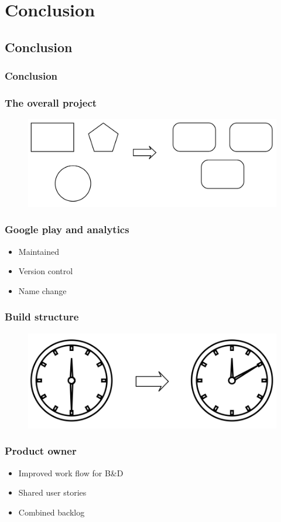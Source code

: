 \section{Conclusion}
\subsection{Conclusion}
\begin{frame}
	\frametitle{Conclusion}
\end{frame}

\begin{frame}
	\frametitle{The overall project}
	\begin{figure}[H]
		\centering
		\includegraphics[width= 0.8 \textwidth]{pictures/SameGUIDesign.png}
	\end{figure}
\end{frame}

\begin{frame}
	\frametitle{Google play and analytics}
	\begin{itemize}
		\item Maintained
		\item Version control
		\item Name change
	\end{itemize}
\end{frame}

\begin{frame}
	\frametitle{Build structure}
	\begin{figure}[H]
		\centering
		\includegraphics[width= 0.8 \textwidth]{pictures/Buildtime.png}
	\end{figure}
\end{frame}

\begin{frame}
	\frametitle{Product owner}
	\begin{itemize}
		\item Improved work flow for B\&D
		\item Shared user stories
		\item Combined backlog
	\end{itemize}
\end{frame}

